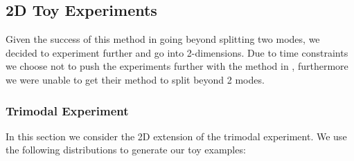 \documentclass[a4paper,12pt,twoside,openright]{report}
\theoremstyle{definition}
\begin{document}
\subsection{2D Toy Experiments}

Given the success of this method in going beyond splitting two modes, we decided to experiment further and go into 2-dimensions. Due to time constraints we choose not to push the experiments further with the method in \cite{pavon2018data}, furthermore we were unable to get their method to split beyond 2 modes. 

\subsubsection{Trimodal Experiment}
In this section we consider the 2D extension of the trimodal experiment.   We use the following distributions to generate our toy examples:
\end{document}
